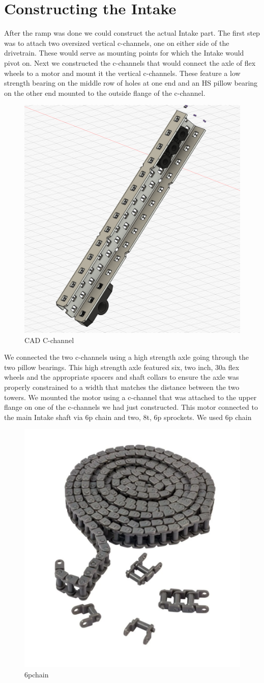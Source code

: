 \section*{Constructing the Intake}
After the ramp was done we could construct the actual Intake part. The first step was to attach two oversized vertical c-channels, one on either side of the drivetrain. These would serve as mounting points for which the Intake would pivot on. Next we constructed the c-channels that would connect the axle of flex wheels to a motor and mount it the vertical c-channels. These feature a low strength bearing on the middle row of holes at one end and an HS pillow bearing on the other end mounted to the outside flange of the c-channel. 
\begin{figure}[H]
    \centering
    \includegraphics[width=0.5\linewidth]{images/flangecchannel.png}
    \caption{CAD C-channel}
\end{figure}
We connected the two c-channels using a high strength axle going through the two pillow bearings. This high strength axle featured six, two inch, 30a flex wheels and the appropriate spacers and shaft collars to ensure the axle was properly constrained to a width that matches the distance between the two towers. We mounted the motor using a c-channel that was attached to the upper flange on one of the c-channels we had just constructed. This motor connected to the main Intake shaft via 6p chain and two, 8t, 6p sprockets. We used 6p chain 
\begin{figure}[H]
    \centering
    \includegraphics[width=0.5\linewidth]{images/6pchain.png}
    \caption{6pchain}
\end{figure}
